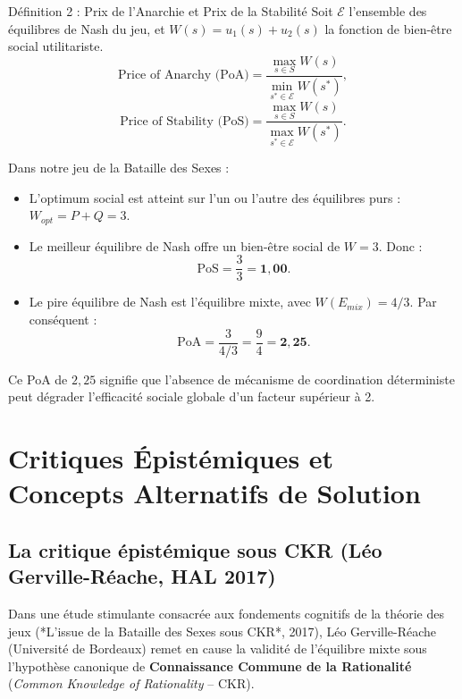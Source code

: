 \documentclass[11pt,a4paper]{article}
\begin{document}
\begin{propbox}{Définition 2 : Prix de l'Anarchie et Prix de la Stabilité}
Soit $\mathcal{E}$ l'ensemble des équilibres de Nash du jeu, et $W(s) = u_1(s) + u_2(s)$ la fonction de bien-être social utilitariste.
\begin{equation}
\text{Price of Anarchy (PoA)} = \frac{\max_{s \in S} W(s)}{\min_{s^* \in \mathcal{E}} W(s^*)},
\end{equation}
\begin{equation}
\text{Price of Stability (PoS)} = \frac{\max_{s \in S} W(s)}{\max_{s^* \in \mathcal{E}} W(s^*)}.
\end{equation}
\end{propbox}

Dans notre jeu de la Bataille des Sexes :
\begin{itemize}[leftmargin=1.5em]
    \item L'optimum social est atteint sur l'un ou l'autre des équilibres purs : $W_{opt} = P + Q = 3$.
    \item Le meilleur équilibre de Nash offre un bien-être social de $W = 3$. Donc :
    \begin{equation}
    \text{PoS} = \frac{3}{3} = \mathbf{1{,}00}.
    \end{equation}
    \item Le pire équilibre de Nash est l'équilibre mixte, avec $W(E_{mix}) = 4/3$. Par conséquent :
    \begin{equation}
    \text{PoA} = \frac{3}{4/3} = \frac{9}{4} = \mathbf{2{,}25}.
    \end{equation}
\end{itemize}

Ce PoA de $2{,}25$ signifie que l'absence de mécanisme de coordination déterministe peut dégrader l'efficacité sociale globale d'un facteur supérieur à 2.

\newpage

\section{Critiques Épistémiques et Concepts Alternatifs de Solution}\label{sec:epistemique}

\subsection{La critique épistémique sous CKR (Léo Gerville-Réache, HAL 2017)}
Dans une étude stimulante consacrée aux fondements cognitifs de la théorie des jeux (*L'issue de la Bataille des Sexes sous CKR*, 2017), Léo Gerville-Réache (Université de Bordeaux) remet en cause la validité de l'équilibre mixte sous l'hypothèse canonique de \textbf{Connaissance Commune de la Rationalité} (\emph{Common Knowledge of Rationality} -- CKR).
\end{document}
